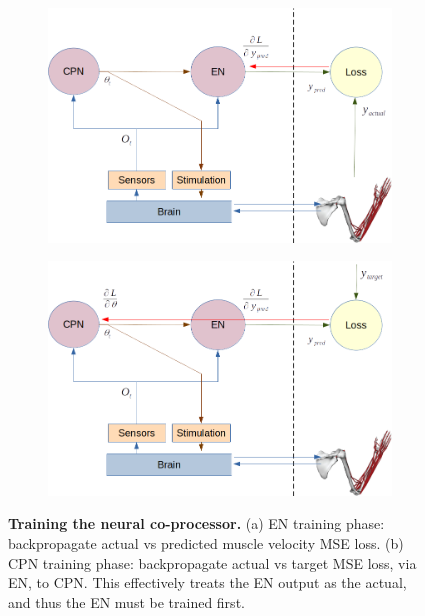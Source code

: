 \documentclass[12pt]{iopart}
\begin{document}
\begin{figure}
	\centering
	\begin{subfigure}[c]{0.48\textwidth}
		\centering
		\includegraphics[width=\textwidth]{backprop_en.png}
		\caption{}
	\end{subfigure}
	\hfill
	\begin{subfigure}[c]{0.48\textwidth}
		\centering
		\includegraphics[width=\textwidth]{backprop_cpn.png}
		\caption{}
	\end{subfigure}
	\hfill
\caption{\textbf{Training the neural co-processor.} (a) EN training phase: 
         backpropagate actual vs predicted muscle velocity MSE loss.
         (b) CPN training phase: backpropagate actual vs target
         MSE loss, via EN, to CPN. This effectively treats the EN
         output as the actual, and thus the EN must be trained first.}
\label{fig:training}
\end{figure}
\end{document}

